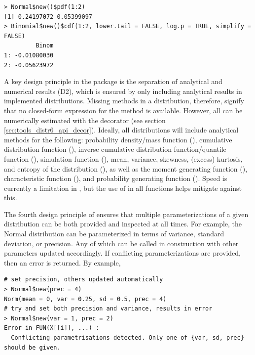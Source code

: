 \begin{verbatim}
> Normal$new()$pdf(1:2)
[1] 0.24197072 0.05399097
> Binomial$new()$cdf(1:2, lower.tail = FALSE, log.p = TRUE, simplify = FALSE)
         Binom
1: -0.01080030
2: -0.05623972
\end{verbatim}


A key design principle in the package is the separation of analytical and numerical results (D2), which is ensured by only including analytical results in implemented distributions. Missing methods in a distribution, therefore, signify that no closed-form expression for the method is available. However, all can be numerically estimated with the  decorator (see section \ref{sec:tools_distr6_api_decor}). Ideally, all distributions will include analytical methods for the following: probability density/mass function (),  cumulative distribution function (), inverse cumulative distribution function/quantile function (), simulation function (), mean, variance, skewness, (excess) kurtosis, and entropy of the distribution (), as well as the moment generating function (), characteristic function (), and probability generating function (). Speed is currently a limitation in , but the use of  \citep{pkgrcpp} in all  functions helps mitigate against this.

The fourth design principle of  ensures that multiple parameterizations of a given distribution can be both provided and inspected at all times. For example, the Normal distribution can be parameterized in terms of variance, standard deviation, or precision. Any of which can be called in construction with other parameters updated accordingly. If conflicting parameterizations are provided, then an error is returned. By example,

\begin{verbatim}
# set precision, others updated automatically
> Normal$new(prec = 4)
Norm(mean = 0, var = 0.25, sd = 0.5, prec = 4)
# try and set both precision and variance, results in error
> Normal$new(var = 1, prec = 2)
Error in FUN(X[[i]], ...) :
  Conflicting parametrisations detected. Only one of {var, sd, prec} should be given.
\end{verbatim}

